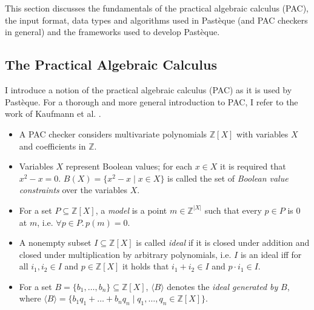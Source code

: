\section{}\label{sec:fundamentals}

This section discusses the fundamentals of the practical algebraic calculus (PAC), the input format, data types and algorithms used in Pastèque (and PAC checkers in general) and the frameworks used to develop Pastèque.

\subsection{The Practical Algebraic Calculus}\label{sec:practical-algebraic-calculus}

I introduce a notion of the practical algebraic calculus (PAC) as it is used by Pastèque.
For a thorough and more general introduction to PAC, I refer to the work of Kaufmann et al. \cite{pac-2018,pac-2024,kaufmann-phd-thesis}.

\begin{itemize}
	\item A PAC checker considers multivariate polynomials $\mathbb{Z}[X]$ with variables $X$ and coefficients in $\mathbb{Z}$.

	\item Variables $X$ represent Boolean values; for each $x \in X$ it is required that $x^2 - x = 0$.
	      $B(X) = \{x^2 - x \mid x \in X\}$ is called the set of \textit{Boolean value constraints} over the variables $X$.
	\item For a set $P \subseteq \mathbb{Z}[X]$, a \textit{model} is a point $m \in \mathbb{Z}^{|X|}$ such that every $p \in P$ is 0 at $m$, i.e. $\forall p \in P.\, p(m) = 0$.
	\item A nonempty subset $I \subseteq \mathbb{Z}[X]$ is called \textit{ideal} if it is closed under addition and closed under multiplication by arbitrary polynomials, i.e.
	      $I$ is an ideal iff for all $i_1,i_2\in I$ and $p \in \mathbb{Z}[X]$ it holds that $i_1 + i_2 \in I$ and $p \cdot i_1 \in I$.
	\item For a set $B = \{ b_1, \dots, b_n \} \subseteq \mathbb{Z}[X]$, $\langle B \rangle$ denotes the \textit{ideal generated by} $B$, where $\langle B \rangle = \{b_1q_1 + \dots + b_nq_n \mid q_1,\dots,q_n \in \mathbb{Z}[X]\}$.
\end{itemize}

